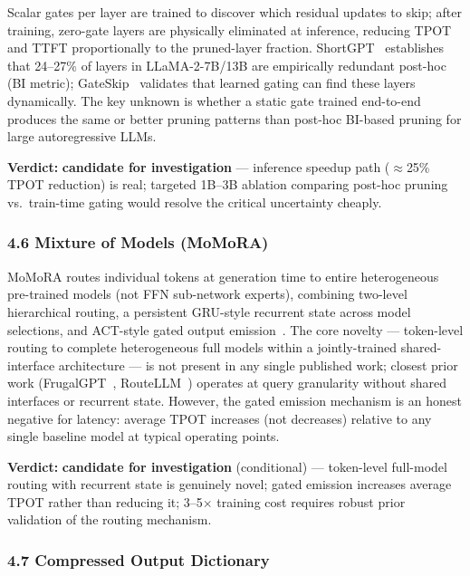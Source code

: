 \documentclass[11pt]{article}
\begin{document}
Scalar gates per layer are trained to discover which residual updates to skip; after training, zero-gate layers are physically eliminated at inference, reducing TPOT and TTFT proportionally to the pruned-layer fraction.
ShortGPT~\cite{Men2024ShortGPT} establishes that 24--27\% of layers in LLaMA-2-7B/13B are empirically redundant post-hoc (BI metric); GateSkip~\cite{Laitenberger2024GateSkip} validates that learned gating can find these layers dynamically.
The key unknown is whether a static gate trained end-to-end produces the same or better pruning patterns than post-hoc BI-based pruning for large autoregressive LLMs.

\textbf{Verdict:} \textbf{candidate for investigation} --- inference speedup path ($\approx$25\% TPOT reduction) is real; targeted 1B--3B ablation comparing post-hoc pruning vs.\ train-time gating would resolve the critical uncertainty cheaply.

\subsubsection{4.6 Mixture of Models (MoMoRA)}
\label{sec:idea_4_6}

MoMoRA routes individual tokens at generation time to entire heterogeneous pre-trained models (not FFN sub-network experts), combining two-level hierarchical routing, a persistent GRU-style recurrent state across model selections, and ACT-style gated output emission~\cite{graves2016act}.
The core novelty --- token-level routing to complete heterogeneous full models within a jointly-trained shared-interface architecture --- is not present in any single published work; closest prior work (FrugalGPT~\cite{Chen2023FrugalGPT}, RouteLLM~\cite{Ong2024RouteLLM}) operates at query granularity without shared interfaces or recurrent state.
However, the gated emission mechanism is an honest negative for latency: average TPOT increases (not decreases) relative to any single baseline model at typical operating points.

\textbf{Verdict:} \textbf{candidate for investigation} (conditional) --- token-level full-model routing with recurrent state is genuinely novel; gated emission increases average TPOT rather than reducing it; 3--5$\times$ training cost requires robust prior validation of the routing mechanism.

\subsubsection{4.7 Compressed Output Dictionary}
\label{sec:idea_4_7}
\end{document}
